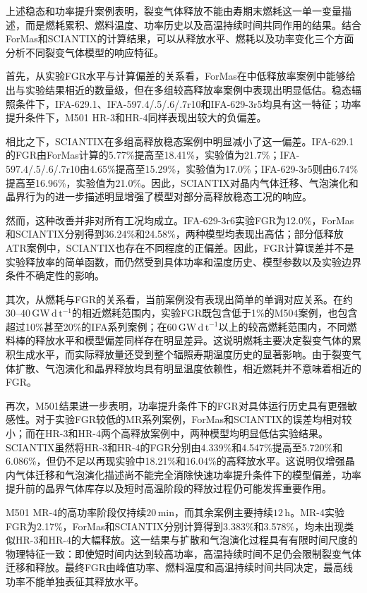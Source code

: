 上述稳态和功率提升案例表明，裂变气体释放不能由寿期末燃耗这一单一变量描述，而是燃耗累积、燃料温度、功率历史以及高温持续时间共同作用的结果。结合ForMas和SCIANTIX的计算结果，可以从释放水平、燃耗以及功率变化三个方面分析不同裂变气体模型的响应特征。

首先，从实验FGR水平与计算偏差的关系看，ForMas在中低释放率案例中能够给出与实验结果相近的数量级，但在多组较高释放率案例中表现出明显低估。稳态辐照条件下，IFA-629.1、IFA-597.4/.5/.6/.7r10和IFA-629-3r5均具有这一特征；功率提升条件下，M501 HR-3和HR-4同样表现出较大的负偏差。

相比之下，SCIANTIX在多组高释放稳态案例中明显减小了这一偏差。IFA-629.1的FGR由ForMas计算的5.77\%提高至18.41\%，实验值为21.7\%；IFA-597.4/.5/.6/.7r10由4.65\%提高至15.29\%，实验值为17.0\%；IFA-629-3r5则由6.74\%提高至16.96\%，实验值为21.0\%。因此，SCIANTIX对晶内气体迁移、气泡演化和晶界行为的进一步描述明显增强了模型对部分高释放稳态工况的响应。

然而，这种改善并非对所有工况均成立。IFA-629-3r6实验FGR为12.0\%，ForMas和SCIANTIX分别得到36.24\%和24.58\%，两种模型均表现出高估；部分低释放ATR案例中，SCIANTIX也存在不同程度的正偏差。因此，FGR计算误差并不是实验释放率的简单函数，而仍然受到具体功率和温度历史、模型参数以及实验边界条件不确定性的影响。

其次，从燃耗与FGR的关系看，当前案例没有表现出简单的单调对应关系。在约$30$--$40\,\mathrm{GW\,d\,t^{-1}}$的相近燃耗范围内，实验FGR既包含低于1\%的M504案例，也包含超过10\%甚至20\%的IFA系列案例；在$60\,\mathrm{GW\,d\,t^{-1}}$以上的较高燃耗范围内，不同燃料棒的释放水平和模型偏差同样存在明显差异。这说明燃耗主要决定裂变气体的累积生成水平，而实际释放量还受到整个辐照寿期温度历史的显著影响。由于裂变气体扩散、气泡演化和晶界释放均具有明显温度依赖性，相近燃耗并不意味着相近的FGR。

再次，M501结果进一步表明，功率提升条件下的FGR对具体运行历史具有更强敏感性。对于实验FGR较低的MR系列案例，ForMas和SCIANTIX的误差均相对较小；而在HR-3和HR-4两个高释放案例中，两种模型均明显低估实验结果。SCIANTIX虽然将HR-3和HR-4的FGR分别由4.339\%和4.547\%提高至5.720\%和6.086\%，但仍不足以再现实验中18.21\%和16.04\%的高释放水平。这说明仅增强晶内气体迁移和气泡演化描述尚不能完全消除快速功率提升条件下的模型偏差，功率提升前的晶界气体库存以及短时高温阶段的释放过程仍可能发挥重要作用。

M501 MR-4的高功率阶段仅持续$20\,\mathrm{min}$，而其余案例主要持续$12\,\mathrm{h}$。MR-4实验FGR为2.17\%，ForMas和SCIANTIX分别计算得到3.383\%和3.578\%，均未出现类似HR-3和HR-4的大幅释放。这一结果与扩散和气泡演化过程具有有限时间尺度的物理特征一致：即使短时间内达到较高功率，高温持续时间不足仍会限制裂变气体迁移和释放。最终FGR由峰值功率、燃料温度和高温持续时间共同决定，最高线功率不能单独表征其释放水平。

